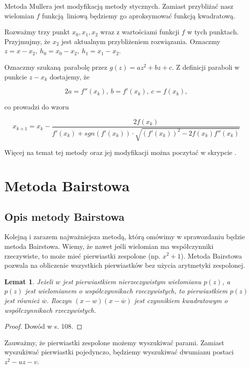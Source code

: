 \documentclass{article}
\newtheorem{lemat}{Lemat}
\begin{document}
Metoda Mullera jest modyfikacją metody stycznych. Zamiast przybliżać nasz wielomian $f$ funkcją liniową będziemy go aproksymować funkcją kwadratową.

Rozważmy trzy punkt $x_0, x_1, x_2$ wraz z wartościami funkcji $f$ w tych punktach. Przyjmujmy, że $x_2$ jest aktualnym przybliżeniem rozwiązania. Oznaczmy $z = x-x_2, \ h_0 = x_0 - x_2, \ h_1 = x_1-x_2$.

Oznaczmy szukaną parabolę przez $g(z) = az^2 + bz + c$. Z definicji paraboli w punkcie $z - x_k$ dostajemy, że 

$$2a = f''(x_k), \ b = f'(x_k), \ c = f(x_k),$$

co prowadzi do wzoru

$$x_{k+1} = x_k - \frac{2f(x_k)}{f'(x_k) + sgn(f'(x_k)) \cdot \sqrt{(f'(x_k))^2 - 2f(x_k)f''(x_k)}}$$

Więcej na temat tej metody oraz jej modyfikacji można poczytać w skrypcie \cite{tajewski}.


\section{Metoda Bairstowa}

\subsection{Opis metody Bairstowa}

Kolejną i zarazem najważniejsza metodą, którą omówimy w sprawozdaniu będzie metoda Bairstowa. Wiemy, że nawet jeśli wielomian ma współczynniki rzeczywiste, to może mieć pierwiastki zespolone (np. $x^2 + 1$). Metoda Bairstowa pozwala na obliczenie wszystkich pierwiastków bez użycia arytmetyki zespolonej.


\begin{lemat}
Jeżeli $w$ jest pierwiastkiem nierzeczywistym wielomianu $p(z)$, a $p(z)$ jest wielomianem o współczynnikach rzeczywistych, to pierwiastkiem $p(z)$ jest również $\overline{w}$. Iloczyn $(x-w)(x-\overline{w})$ jest czynnikiem kwadratowym o współczynnikach rzeczywistych.
\end{lemat}

\begin{proof}
Dowód w \cite{kincaid} s. 108.	
\end{proof}

Zauważmy, że pierwiastki zespolone możemy wyszukiwać parami. Zamiast wyszukiwać pierwiastki pojedynczo, będziemy wyszukiwać dwumianu postaci $z^2 - uz - v$.
\end{document}
